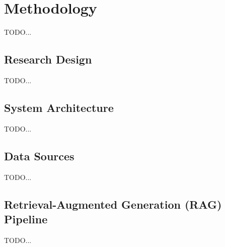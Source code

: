 \chapter{Methodology}
\label{sec:Method}
\label{Chapter3} %

TODO...

\section{Research Design}
TODO...

\section{System Architecture}
TODO...

\section{Data Sources}
TODO...

\section{Retrieval-Augmented Generation (RAG) Pipeline}
TODO...

